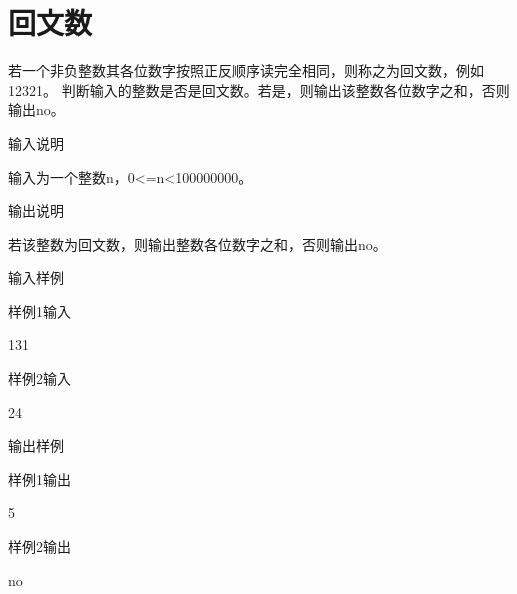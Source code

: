 \section{回文数}
若一个非负整数其各位数字按照正反顺序读完全相同，则称之为回文数，例如12321。
判断输入的整数是否是回文数。若是，则输出该整数各位数字之和，否则输出no。

输入说明	

输入为一个整数n，0<=n<100000000。

输出说明	

若该整数为回文数，则输出整数各位数字之和，否则输出no。

输入样例
	
样例1输入

131

样例2输入

24

输出样例

样例1输出
	
5

样例2输出

no

